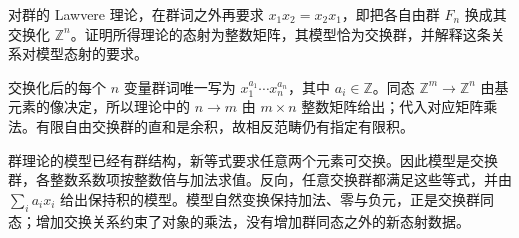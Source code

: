 \begin{exercise}\label{b4:ex:A-lawvere-abelian-groups}
	对群的 Lawvere 理论，在群词之外再要求 \(x_1x_2=x_2x_1\)，即把各自由群 \(F_n\) 换成其交换化 \(\mathbb Z^n\)。证明所得理论的态射为整数矩阵，其模型恰为交换群，并解释这条关系对模型态射的要求。
\end{exercise}
\begin{solution}
	交换化后的每个 \(n\) 变量群词唯一写为 \(x_1^{a_1}\cdots x_n^{a_n}\)，其中 \(a_i\in\mathbb Z\)。同态 \(\mathbb Z^m\to\mathbb Z^n\) 由基元素的像决定，所以理论中的 \(n\to m\) 由 \(m\times n\) 整数矩阵给出；代入对应矩阵乘法。有限自由交换群的直和是余积，故相反范畴仍有指定有限积。

	群理论的模型已经有群结构，新等式要求任意两个元素可交换。因此模型是交换群，各整数系数项按整数倍与加法求值。反向，任意交换群都满足这些等式，并由 \(\sum_i a_ix_i\) 给出保持积的模型。模型自然变换保持加法、零与负元，正是交换群同态；增加交换关系约束了对象的乘法，没有增加群同态之外的新态射数据。
\end{solution}
